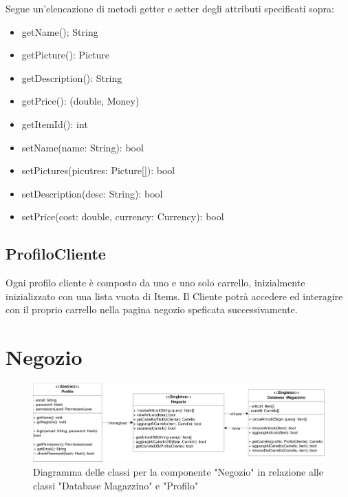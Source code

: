 \documentclass{report}
\begin{document}
Segue un'elencazione di metodi getter e setter degli attributi specificati sopra:
\begin{itemize}
\item  getName(); String

\item getPicture(): Picture

\item getDescription(): String

\item getPrice(): (double, Money)

\item getItemId(): int

\item setName(name: String): bool

\item setPictures(picutres: Picture[]): bool

\item setDescription(desc: String): bool

\item setPrice(cost: double, currency: Currency): bool

\end{itemize}

\subsection*{ProfiloCliente}

Ogni profilo cliente è composto da uno e uno solo carrello, inizialmente inizializzato con una lista vuota di Items. Il Cliente potrà accedere ed interagire con il proprio carrello nella pagina negozio speficata successivamente.



\section{Negozio}


\begin{figure}[H]
	\centering\includegraphics[width=1\textwidth]{images/Diagramma_delle_classi_negozio_2.png}
	Diagramma delle classi per la componente "Negozio" in relazione alle classi "Database Magazzino" e "Profilo"
\end{figure}
\end{document}
